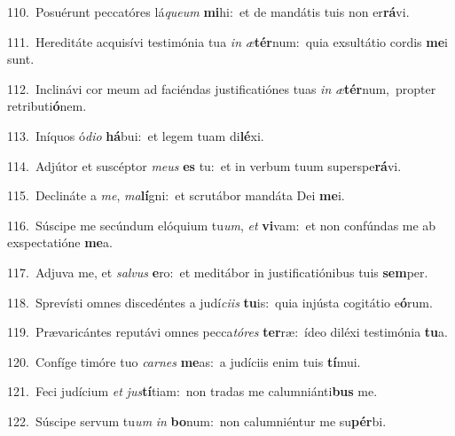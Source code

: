 {\numbfont\textcolor{\numbcolor}{110.}}~Posuérunt peccatóres lá\-\textit{que}\-\textit{um} \textbf{mi}\-hi:~\star et de mandátis tuis non er\-\textbf{rá}\-vi.\par
{\numbfont\textcolor{\numbcolor}{111.}}~Hereditáte acquisívi testimónia tua \textit{in} \textit{æ}\-\textbf{tér}num:~\star quia exsultátio cordis \textbf{me}\-i sunt.\par
{\numbfont\textcolor{\numbcolor}{112.}}~Inclinávi cor meum ad faciéndas justificatiónes tuas \textit{in} \textit{æ}\-\textbf{tér}num,~\star propter retributi\-\textbf{ó}\-nem.\par
{\numbfont\textcolor{\numbcolor}{113.}}~Iníquos ó\-\textit{di}\-\textit{o} \textbf{há}\-bui:~\star et legem tuam di\-\textbf{lé}\-xi.\par
{\numbfont\textcolor{\numbcolor}{114.}}~Adjútor et suscéptor \textit{me}\-\textit{us} \textbf{es} tu:~\star et in verbum tuum superspe\-\textbf{rá}\-vi.\par
{\numbfont\textcolor{\numbcolor}{115.}}~Declináte a \textit{me}\-, \textit{ma}\-\textbf{lí}gni:~\star et scrutábor mandáta Dei \textbf{me}\-i.\par
{\numbfont\textcolor{\numbcolor}{116.}}~Súscipe me secúndum elóquium tu\-\textit{um}\-, \textit{et} \textbf{vi}\-vam:~\star et non confúndas me ab exspectatióne \textbf{me}\-a.\par
{\numbfont\textcolor{\numbcolor}{117.}}~Adjuva me, et \textit{sal}\-\textit{vus} \textbf{e}\-ro:~\star et meditábor in justificatiónibus tuis \textbf{sem}\-per.\par
{\numbfont\textcolor{\numbcolor}{118.}}~Sprevísti omnes discedéntes a judí\-\textit{ci}\-\textit{is} \textbf{tu}\-is:~\star quia injústa cogitátio e\-\textbf{ó}\-rum.\par
{\numbfont\textcolor{\numbcolor}{119.}}~Prævaricántes reputávi omnes pecca\-\textit{tó}\-\textit{res} \textbf{ter}\-ræ:~\star ídeo diléxi testimónia \textbf{tu}\-a.\par
{\numbfont\textcolor{\numbcolor}{120.}}~Confíge timóre tuo \textit{car}\-\textit{nes} \textbf{me}\-as:~\star a judíciis enim tuis \textbf{tí}\-mui.\par
{\numbfont\textcolor{\numbcolor}{121.}}~Feci judícium \textit{et} \textit{jus}\-\textbf{tí}tiam:~\star non tradas me calumniánti\textbf{bus} me.\par
{\numbfont\textcolor{\numbcolor}{122.}}~Súscipe servum tu\textit{um} \textit{in} \textbf{bo}\-num:~\star non calumniéntur me su\-\textbf{pér}\-bi.\par
